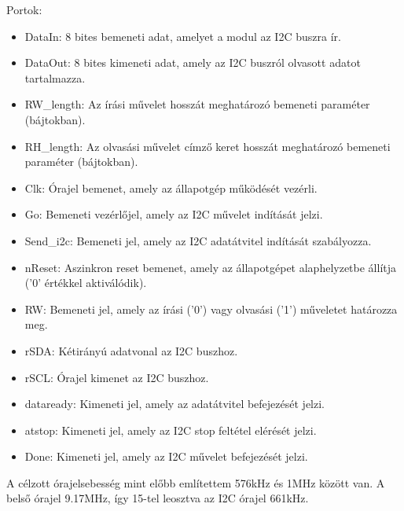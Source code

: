 \documentclass[a4paper,12pt,oneside]{book}
\begin{document}
Portok:
\begin{itemize}
	\item DataIn: 8 bites bemeneti adat, amelyet a modul az I2C buszra ír.
	\item DataOut: 8 bites kimeneti adat, amely az I2C buszról olvasott adatot tartalmazza.
	\item RW\_length: Az írási művelet hosszát meghatározó bemeneti paraméter (bájtokban).
	\item RH\_length: Az olvasási művelet címző keret hosszát meghatározó bemeneti paraméter (bájtokban).
	\item Clk: Órajel bemenet, amely az állapotgép működését vezérli.
	\item Go: Bemeneti vezérlőjel, amely az I2C művelet indítását jelzi.
	\item Send\_i2c: Bemeneti jel, amely az I2C adatátvitel indítását szabályozza.
	\item nReset: Aszinkron reset bemenet, amely az állapotgépet alaphelyzetbe állítja ('0' értékkel aktiválódik).
	\item RW: Bemeneti jel, amely az írási ('0') vagy olvasási ('1') műveletet határozza meg.
	\item rSDA: Kétirányú adatvonal az I2C buszhoz.
	\item rSCL: Órajel kimenet az I2C buszhoz.
	\item dataready: Kimeneti jel, amely az adatátvitel befejezését jelzi.
	\item atstop: Kimeneti jel, amely az I2C stop feltétel elérését jelzi.
	\item Done: Kimeneti jel, amely az I2C művelet befejezését jelzi.
\end{itemize}
A célzott órajelsebesség mint előbb említettem 576kHz és 1MHz között van. A belső órajel 9.17MHz, így 15-tel leosztva az I2C órajel 661kHz.
\end{document}
